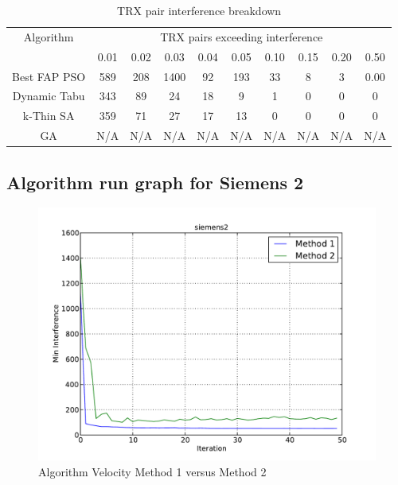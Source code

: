 \begin{table}[H]
\centering
	\begin{tabular}{cccccccccc}
	\toprule
    Algorithm & \multicolumn{9}{c}{TRX pairs exceeding interference}\\
    & 0.01 & 0.02 & 0.03 & 0.04 & 0.05 & 0.10 & 0.15 & 0.20 & 0.50 \\
    \midrule
    Best FAP PSO & 589 & 208 & 1400 & 92 & 193 & 33 & 8 & 3 & 0.00\\
    Dynamic Tabu & 343 & 89 & 24 & 18 & 9 & 1 & 0 & 0 & 0\\
    k-Thin SA & 359 & 71 & 27 & 17 & 13 & 0 & 0 & 0 & 0\\
    GA & \scriptsize{N/A} & \scriptsize{N/A} & \scriptsize{N/A} & \scriptsize{N/A} & \scriptsize{N/A} & \scriptsize{N/A} & \scriptsize{N/A} & \scriptsize{N/A} & \scriptsize{N/A}\\
    \bottomrule
	\end{tabular}
\caption{TRX pair interference breakdown}
\label{tab:breakdown-siem2m1}
\end{table}

\subsection{Algorithm run graph for Siemens 2}
\begin{figure}[H]
	\begin{centering}
    \includegraphics[scale=0.5]{../Implementation/data-cruncher/graph/siemens2.pdf}
	\caption{Algorithm Velocity Method 1 versus Method 2}
	\label{fig:siem2graph}
	\end{centering}
\end{figure}


